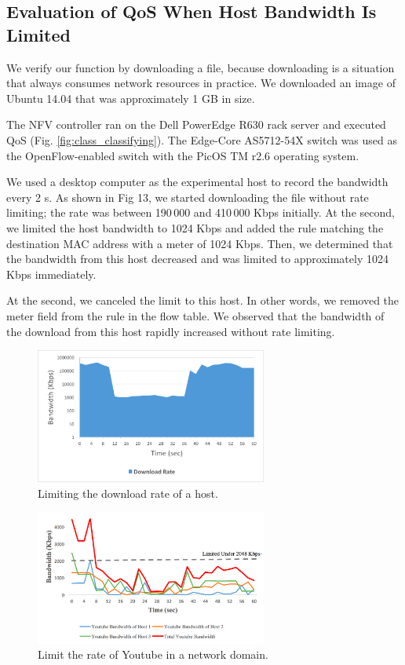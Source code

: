 \documentclass[journal]{IEEEtran}
\begin{document}
\subsection{Evaluation of QoS When Host Bandwidth Is Limited}

We verify our function by downloading a file, because downloading is a situation that always consumes network resources in practice. We downloaded an image of Ubuntu 14.04 that was approximately 1 GB in size.


The NFV controller ran on the Dell PowerEdge R630 rack server and executed QoS (Fig. \ref{fig:class_classifying}). The Edge-Core AS5712-54X \cite{edge-core-switch} switch was used as the OpenFlow-enabled switch with the PicOS TM r2.6 operating system.

We used a desktop computer as the experimental host to record the bandwidth every 2 s. As shown in Fig 13, we started downloading the file without rate limiting; the rate was between 190 000 and 410 000 Kbps initially. At the  second, we limited the host bandwidth to 1024 Kbps and added the rule matching the destination MAC address with a meter of 1024 Kbps. Then, we determined that the bandwidth from this host decreased and was limited to approximately 1024 Kbps immediately.

At the  second, we canceled the limit to this host. In other words, we removed the meter field from the rule in the flow table. We observed that the bandwidth of the download from this host rapidly increased without rate limiting.

\begin{figure}[!t]
\centering
\includegraphics[width=3in]{./figures/qos_limit_host}
\caption{Limiting the download rate of a host.}
\label{fig:qos_limit_host}
\end{figure}

\begin{figure}[!t]
\centering
\includegraphics[width=3in]{./figures/mft_qos_rate_domain_app}
\caption{Limit the rate of Youtube in a network domain.}
\label{fig:mft_qos_rate_domain_app}
\end{figure}
\end{document}
